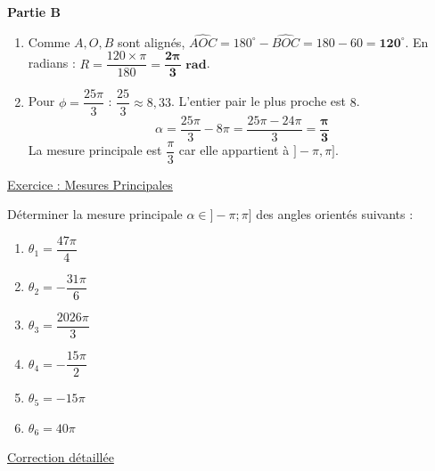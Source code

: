\documentclass[12pt,a4paper]{article}
\begin{document}
\noindent \textbf{Partie B}
\begin{enumerate}
    \item Comme $A, O, B$ sont alignés, $\widehat{AOC} = 180^\circ - \widehat{BOC} = 180 - 60 = \mathbf{120^\circ}$.
    En radians : $R = \dfrac{120 \times \pi}{180} = \mathbf{\dfrac{2\pi}{3} \text{ rad}}$.
    \item Pour $\phi = \dfrac{25\pi}{3}$ :
    $\dfrac{25}{3} \approx 8,33$. L'entier pair le plus proche est $8$.
    \[ \alpha = \frac{25\pi}{3} - 8\pi = \frac{25\pi - 24\pi}{3} = \mathbf{\dfrac{\pi}{3}} \]
    La mesure principale est $\dfrac{\pi}{3}$ car elle appartient à $]-\pi, \pi]$.
\end{enumerate}

\begin{center}
    \textcolor{monRouge}{\underline{\Large Exercice : Mesures Principales}}
\end{center}

\noindent Déterminer la mesure principale $\alpha \in ]-\pi ; \pi]$ des angles orientés suivants :

\begin{enumerate}
    \item[a)] $\theta_1 = \dfrac{47\pi}{4}$
    \item[b)] $\theta_2 = -\dfrac{31\pi}{6}$
    \item[c)] $\theta_3 = \dfrac{2026\pi}{3}$
    \item[d)] $\theta_4 = -\dfrac{15\pi}{2}$
    \item[e)] $\theta_5 = -15\pi$
    \item[f)] $\theta_6 = 40\pi$
\end{enumerate}

\vspace{2em}

\begin{center}
    \textcolor{monRouge}{\underline{\Large Correction détaillée}}
\end{center}
\end{document}
